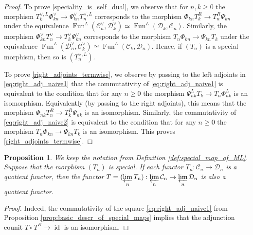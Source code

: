 \documentclass[11pt,leqno]{amsart}
\newtheorem{prop}[theo]{Proposition}
\numberwithin{equation}{section}
\newcommand{\prolim}[1][]{\mathop{\varprojlim}\limits_{#1}}
\newcommand{\cD}{{\mathcal D}}
\newcommand{\cC}{{\mathcal C}}
\newcommand{\Fun}{\operatorname{Fun}}
\newcommand{\id}{\operatorname{id}}
\begin{document}
\begin{proof}To prove \ref{speciality_is_self_dual}, we observe that for $n,k\geq 0$ the morphism $T_k^{\vee,L}\Phi_{kn}^{\vee}\to \Psi_{kn}^{\vee}T_n^{\vee,L}$ corresponds to the morphism $\Phi_{kn}T_k^R\to T_n^R\Psi_{kn}$ under the equivalence $\Fun^L(\cC_n^{\vee},\cD_k^{\vee})\simeq \Fun^L(\cD_k,\cC_n).$ Similarly, the morphism $\Phi_{kn}^{\vee}T_n^{\vee}\to T_k^{\vee}\Psi_{kn}^{\vee}$ corresponds to the morphism $T_n\Phi_{kn}\to\Psi_{kn}T_k$ under the equivalence $\Fun^L(\cD_n^{\vee},\cC_k^{\vee})\simeq \Fun^L(\cC_k,\cD_n).$ Hence, if $(T_n)$ is a special morphism, then so is $(T_n^{\vee,L}).$

To prove \ref{right_adjoints_termwise}, we observe by passing to the left adjoints in \eqref{eq:right_adj_naive1} that the commutativity of \eqref{eq:right_adj_naive1} is equivalent to the condition that for any $n\geq 0$ the morphism $\Psi_{nk}^L T_k\to T_n\Phi_{nk}^L$ is an isomorphism. Equivalently (by passing to the right adjoints), this means that the morphism $\Phi_{nk}T_n^R\to T_k^R\Psi_{nk}$ is an isomorphism. Similarly, the commutativity of \eqref{eq:right_adj_naive2} is equivalent to the condition that for any $n\geq 0$ the morphism $T_n\Phi_{kn}\to\Psi_{kn}T_k$ is an isomorphism. This proves \ref{right_adjoints_termwise}.\end{proof}

\begin{prop}\label{prop:limit_of_epi_is_epi} We keep the notation from Definition \ref{def:special_map_of_ML}. Suppose that the morphism $(T_n)$ is special. If each functor $T_n:\cC_n\to\cD_n$ is a quotient functor, then the functor $T=(\prolim[n] T_n):\prolim[n]\cC_n\to\prolim[n]\cD_n$ is also a quotient functor.\end{prop}

\begin{proof}
	Indeed, the commutativity of the square \eqref{eq:right_adj_naive1} from Proposition \ref{prop:basic_descr_of_special_maps} implies that the adjunction counit $T\circ T^R\to\id$ is an isomorphism.
\end{proof}
\end{document}
